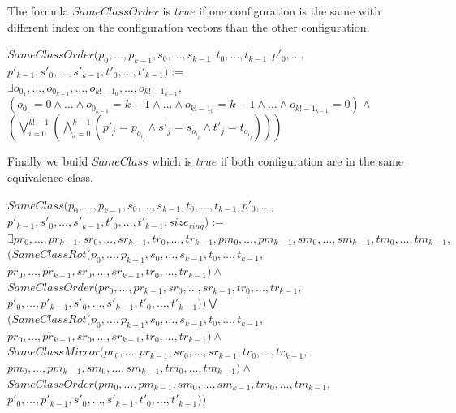 \documentclass{article}
\begin{document}
\noindent The formula $SameClassOrder$ is $true$ if one configuration is the same with different index on the configuration vectors than the other configuration.

\begin{center}
    
    $SameClassOrder(p_{0}, \dots, p_{k-1}, s_{0}, \dots, s_{k-1}, t_{0}, \dots, t_{k-1}, p'_{0}, \dots,$\\
    $p'_{k-1}, s'_{0}, \dots, s'_{k-1}, t'_{0}, \dots, t'_{k-1}):=$\\
    $\exists o_{0_{1}},\dots, o_{0_{k-1}}, \dots, o_{k!-1_{0}}, \dots, o_{k!-1_{k-1}},$\\
    $( o_{0_{1}} = 0 \land \dots \land o_{0_{k-1}} = k-1 \land \dots \land o_{k!-1_{0}} = k-1 \land \dots \land o_{k!-1_{k-1}} = 0 ) \land $\\
    $(\bigvee_{i=0}^{k!-1} (\bigwedge_{j=0}^{k-1} (p'_{j} = p_{o_{i_{j}}} \land s'_{j} = s_{o_{i_{j}}} \land t'_{j} = t_{o_{i_{j}}}  ) ) )$
\end{center}

\noindent Finally we build $SameClass$ which is $true$ if both configuration are in the same equivalence class.

\begin{center}
    
    $SameClass(p_{0}, \dots, p_{k-1}, s_{0}, \dots, s_{k-1}, t_{0}, \dots, t_{k-1}, p'_{0}, \dots,$\\
    $p'_{k-1}, s'_{0}, \dots, s'_{k-1}, t'_{0}, \dots, t'_{k-1}, size_{ring}):=$\\
    $\exists pr_{0}, \dots, pr_{k-1}, sr_{0}, \dots, sr_{k-1}, tr_{0}, \dots, tr_{k-1}, pm_{0}, \dots, pm_{k-1}, sm_{0}, \dots, sm_{k-1}, tm_{0}, \dots, tm_{k-1},$\\
    $(SameClassRot(p_{0}, \dots, p_{k-1}, s_{0}, \dots, s_{k-1}, t_{0}, \dots, t_{k-1},$\\
    $pr_{0}, \dots, pr_{k-1}, sr_{0}, \dots, sr_{k-1}, tr_{0}, \dots, tr_{k-1}) \land$\\
    $SameClassOrder(pr_{0}, \dots, pr_{k-1}, sr_{0}, \dots, sr_{k-1}, tr_{0}, \dots, tr_{k-1},$\\$
    p'_{0}, \dots, p'_{k-1}, s'_{0}, \dots, s'_{k-1}, t'_{0}, \dots, t'_{k-1}))\bigvee$\\
    $(SameClassRot(p_{0}, \dots, p_{k-1}, s_{0}, \dots, s_{k-1}, t_{0}, \dots, t_{k-1},$\\
    $pr_{0}, \dots, pr_{k-1}, sr_{0}, \dots, sr_{k-1}, tr_{0}, \dots, tr_{k-1}) \land$\\
    $SameClassMirror(pr_{0}, \dots, pr_{k-1}, sr_{0}, \dots, sr_{k-1}, tr_{0}, \dots, tr_{k-1},$\\
    $pm_{0}, \dots, pm_{k-1}, sm_{0}, \dots, sm_{k-1}, tm_{0}, \dots, tm_{k-1})\land$\\
    $SameClassOrder(pm_{0}, \dots, pm_{k-1}, sm_{0}, \dots, sm_{k-1}, tm_{0}, \dots, tm_{k-1},$\\
    $p'_{0}, \dots,p'_{k-1}, s'_{0}, \dots, s'_{k-1}, t'_{0}, \dots, t'_{k-1}) )$
\end{center}
\end{document}
